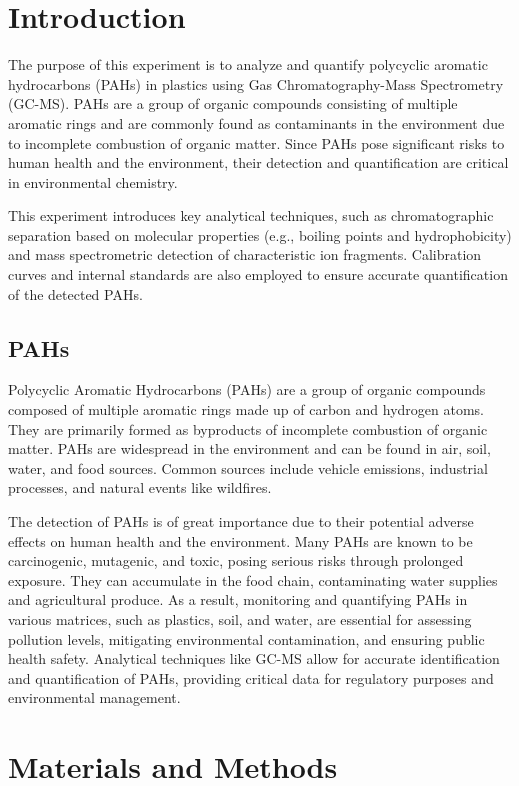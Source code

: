 \documentclass{article}
\begin{document}
\section{Introduction}
The purpose of this experiment is to analyze and quantify polycyclic aromatic hydrocarbons
(PAHs) in plastics using Gas Chromatography-Mass Spectrometry (GC-MS). PAHs are a group of
organic compounds consisting of multiple aromatic rings and are commonly found as
contaminants in the environment due to incomplete combustion of organic matter. Since PAHs
pose significant risks to human health and the environment, their detection and
quantification are critical in environmental chemistry.

This experiment introduces key analytical techniques, such as chromatographic separation
based on molecular properties (e.g., boiling points and hydrophobicity) and mass
spectrometric detection of characteristic ion fragments. Calibration curves and internal
standards are also employed to ensure accurate quantification of the detected PAHs.

\subsection{PAHs}
Polycyclic Aromatic Hydrocarbons (PAHs) are a group of organic compounds composed of
multiple aromatic rings made up of carbon and hydrogen atoms. They are primarily formed as
byproducts of incomplete combustion of organic matter. PAHs are widespread in the
environment and can be found in air, soil, water, and food sources. Common sources
include vehicle emissions, industrial processes, and natural events like wildfires.

The detection of PAHs is of great importance due to their potential adverse effects on
human health and the environment. Many PAHs are known to be carcinogenic, mutagenic, and
toxic, posing serious risks through prolonged exposure. They can accumulate in the food
chain, contaminating water supplies and agricultural produce. As a result, monitoring and
quantifying PAHs in various matrices, such as plastics, soil, and water, are essential for
assessing pollution levels, mitigating environmental contamination, and ensuring public
health safety. Analytical techniques like GC-MS allow for accurate identification and
quantification of PAHs, providing critical data for regulatory purposes and environmental
management.

\section{Materials and Methods}
\end{document}
